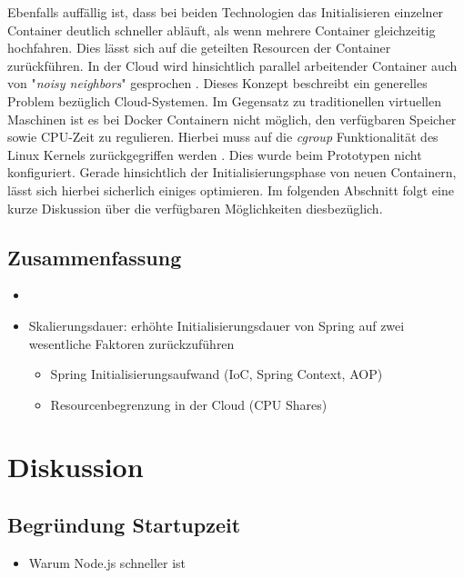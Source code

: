 


Ebenfalls auffällig ist, dass bei beiden Technologien das Initialisieren einzelner Container deutlich schneller abläuft, als wenn mehrere Container gleichzeitig hochfahren. Dies lässt sich auf die geteilten Resourcen der Container zurückführen. In der Cloud wird hinsichtlich parallel arbeitender Container auch von "\emph{noisy neighbors}" gesprochen \cite[Seite~67 ff.]{oreilly-docker}. Dieses Konzept beschreibt ein generelles Problem bezüglich Cloud-Systemen. Im Gegensatz zu traditionellen virtuellen Maschinen ist es bei Docker Containern nicht möglich, den verfügbaren Speicher sowie CPU-Zeit zu regulieren. Hierbei muss auf die \emph{cgroup} Funktionalität des Linux Kernels zurückgegriffen werden . Dies wurde beim Prototypen nicht konfiguriert. Gerade hinsichtlich der Initialisierungsphase von neuen Containern, lässt sich hierbei sicherlich einiges optimieren. Im folgenden Abschnitt folgt eine kurze Diskussion über die verfügbaren Möglichkeiten diesbezüglich.






\subsection{Zusammenfassung}

\begin{itemize}
	\item 
	\item Skalierungsdauer: erhöhte Initialisierungsdauer von Spring auf zwei wesentliche Faktoren zurückzuführen
	\begin{itemize}
		\item Spring Initialisierungsaufwand (IoC, Spring Context, AOP)
		\item Resourcenbegrenzung in der Cloud (CPU Shares)
	\end{itemize}
\end{itemize}


\section{Diskussion}

\subsection{Begr\"undung Startupzeit}
\begin{itemize}
  \item Warum Node.js schneller ist
\end{itemize}

